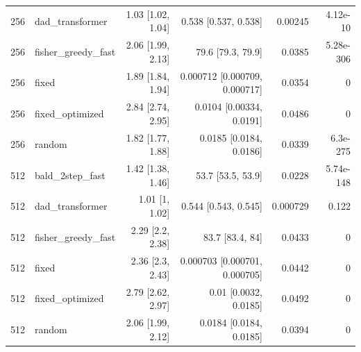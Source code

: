 \begin{tabular}{llrrrr}
256 & dad\_transformer & 1.03 [1.02, 1.04] & 0.538 [0.537, 0.538] & 0.00245 & 4.12e-10 \\
256 & fisher\_greedy\_fast & 2.06 [1.99, 2.13] & 79.6 [79.3, 79.9] & 0.0385 & 5.28e-306 \\
256 & fixed & 1.89 [1.84, 1.94] & 0.000712 [0.000709, 0.000717] & 0.0354 & 0 \\
256 & fixed\_optimized & 2.84 [2.74, 2.95] & 0.0104 [0.00334, 0.0191] & 0.0486 & 0 \\
256 & random & 1.82 [1.77, 1.88] & 0.0185 [0.0184, 0.0186] & 0.0339 & 6.3e-275 \\
512 & bald\_2step\_fast & 1.42 [1.38, 1.46] & 53.7 [53.5, 53.9] & 0.0228 & 5.74e-148 \\
512 & dad\_transformer & 1.01 [1, 1.02] & 0.544 [0.543, 0.545] & 0.000729 & 0.122 \\
512 & fisher\_greedy\_fast & 2.29 [2.2, 2.38] & 83.7 [83.4, 84] & 0.0433 & 0 \\
512 & fixed & 2.36 [2.3, 2.43] & 0.000703 [0.000701, 0.000705] & 0.0442 & 0 \\
512 & fixed\_optimized & 2.79 [2.62, 2.97] & 0.01 [0.0032, 0.0185] & 0.0492 & 0 \\
512 & random & 2.06 [1.99, 2.12] & 0.0184 [0.0184, 0.0185] & 0.0394 & 0 \\
\bottomrule
\end{tabular}
